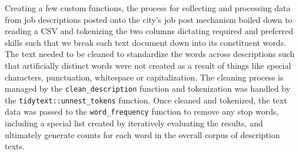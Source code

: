 \documentclass[]{article}
\begin{document}
Creating a few custom functions, the process for collecting and
processing data from job descriptions posted onto the city's job post
mechanism boiled down to reading a CSV and tokenizing the two columns
dictating required and preferred skills such that we break each text
document down into its constituent words. The text needed to be cleaned
to standardize the words across descriptions such that artificially
distinct words were not created as a result of things like special
characters, punctuation, whitespace or capitalization. The cleaning
process is managed by the \texttt{clean\_description} function and
tokenization was handled by the \texttt{tidytext::unnest\_tokens}
function. Once cleaned and tokenized, the text data was passed to the
\texttt{word\_frequency} function to remove any stop words, including a
special list created by iteratively evaluating the results, and
ultimately generate counts for each word in the overall corpus of
description texts.
\end{document}
